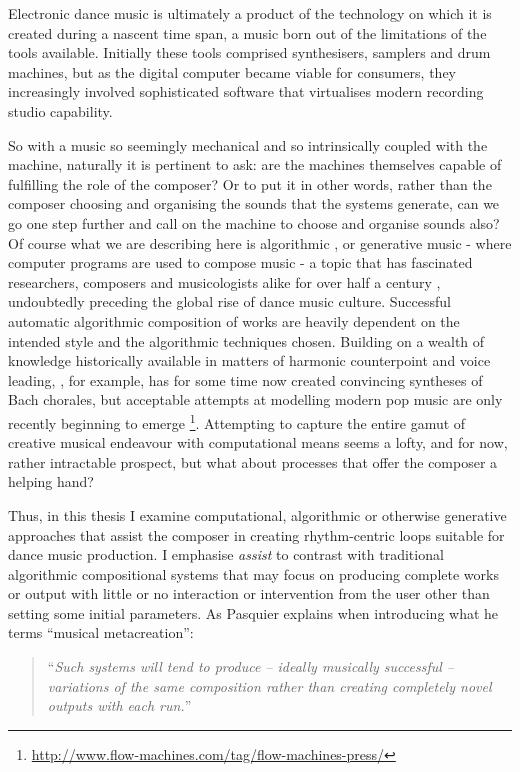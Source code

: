 Electronic dance music is ultimately a product of the technology on which it is created during a nascent time span, a music born out of the limitations of the tools available. Initially these tools comprised synthesisers, samplers and drum machines, but as the digital computer became viable for consumers, they increasingly involved sophisticated software that virtualises modern recording studio capability. 

So with a music so seemingly mechanical and so intrinsically coupled with the machine, naturally it is pertinent to ask: are the machines themselves capable of fulfilling the role of the composer? Or to put it in other words, rather than the composer choosing and organising the sounds that the systems generate, can we go one step further and call on the machine to choose and organise sounds also? Of course what we are describing here is algorithmic \citep{Roads1996}, or generative music \citep{Collins2008} - where computer programs are used to compose music - a topic that has fascinated researchers, composers and musicologists alike for over half a century \citep{Burns1994, Fernandez2013}, undoubtedly preceding the global rise of dance music culture. Successful automatic algorithmic composition of works are heavily dependent on the intended style and the algorithmic techniques chosen. Building on a wealth of knowledge historically available in matters of harmonic counterpoint and voice leading, \cite{Cope1991}, for example, has for some time now created convincing syntheses of Bach chorales, but acceptable attempts at modelling modern pop music are only recently beginning to emerge \citep{Ghedini2015, deltorn2017deep, Pachet2017}\footnote{\url{http://www.flow-machines.com/tag/flow-machines-press/}}. Attempting to capture the entire gamut of creative musical endeavour with computational means seems a lofty, and for now, rather intractable prospect, but what about processes that offer the composer a helping hand?

Thus, in this thesis I examine computational, algorithmic or otherwise generative approaches that assist the composer in creating rhythm-centric loops suitable for dance music production. I emphasise \textit{assist} to contrast with traditional algorithmic compositional systems that may focus on producing complete works or output with little or no interaction or intervention from the user other than setting some initial parameters. As Pasquier explains when introducing what he terms “musical metacreation”:

\blockcquote[]{Pasquier2017}{``\textit{Such systems will tend to produce – ideally musically successful – variations of the same composition rather than creating completely novel outputs with each run.}''}

